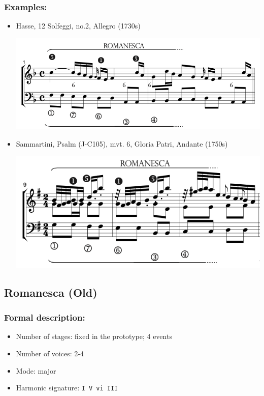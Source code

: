 ﻿\documentclass[11pt, openany]{article}
\begin{document}
\begin{itemize}
\subsubsection{Examples:}
\begin{itemize}
\item Hasse, 12 Solfeggi, no.2, Allegro (1730s)
\begin{center}
\includegraphics[scale=0.5]{hassesolfeggi.png}
\end{center}
\item Sammartini, Psalm (J-C105), mvt. 6, Gloria Patri, Andante (1750s)
\begin{center}
\includegraphics[scale=0.5]{sammartini105.png}
\end{center}
\end{itemize}


	\subsection{Romanesca (Old)}
	
\subsubsection{Formal description:}
\begin{itemize}
\item Number of stages: fixed in the prototype; 4 events
\item Number of voices: 2-4
\item Mode: major
\item Harmonic signature: \texttt{I V vi III}
\end{itemize}


\end{itemize}
\end{document}
